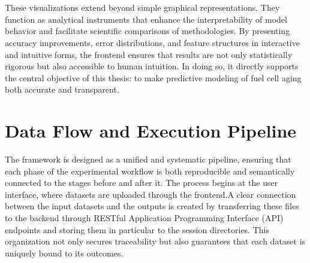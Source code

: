 \\\\These visualizations extend beyond simple graphical representations. They function as analytical instruments that enhance the interpretability of model behavior and facilitate scientific comparisons of methodologies. By presenting accuracy improvements, error distributions, and feature structures in interactive and intuitive forms, the frontend ensures that results are not only statistically rigorous but also accessible to human intuition. In doing so, it directly supports the central objective of this thesis: to make predictive modeling of fuel cell aging both accurate and transparent.

\section{Data Flow and Execution Pipeline}

The framework is designed as a unified and systematic pipeline, ensuring that each phase of the experimental workflow is both reproducible and semantically connected to the stages before and after it. The process begins at the user interface, where datasets are uploaded through the frontend.A clear connection between the input datasets and the outputs is created by transferring these files to the backend through RESTful Application Programming Interface (API) endpoints and storing them in particular to the session directories. This organization not only secures traceability but also guarantees that each dataset is uniquely bound to its outcomes.

